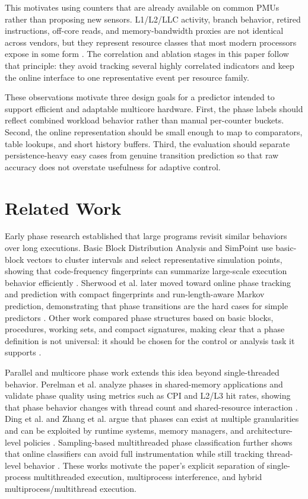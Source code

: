 \documentclass[10pt,twocolumn]{article}
\begin{document}
This motivates using counters that are already available on common PMUs rather than proposing new sensors.
L1/L2/LLC activity, branch behavior, retired instructions, off-core reads, and memory-bandwidth proxies are not identical across vendors, but they represent resource classes that most modern processors expose in some form \cite{intel2024optimization,intel2024sdm,linux2024perf,perfwiki2024}.
The correlation and ablation stages in this paper follow that principle: they avoid tracking several highly correlated indicators and keep the online interface to one representative event per resource family.

These observations motivate three design goals for a predictor intended to support efficient and adaptable multicore hardware.
First, the phase labels should reflect combined workload behavior rather than manual per-counter buckets.
Second, the online representation should be small enough to map to comparators, table lookups, and short history buffers.
Third, the evaluation should separate persistence-heavy easy cases from genuine transition prediction so that raw accuracy does not overstate usefulness for adaptive control.

\section{Related Work}

Early phase research established that large programs revisit similar behaviors over long executions.
Basic Block Distribution Analysis and SimPoint use basic-block vectors to cluster intervals and select representative simulation points, showing that code-frequency fingerprints can summarize large-scale execution behavior efficiently \cite{sherwood2001bbda,sherwood2002simpoint,hamerly2005simpoint3}.
Sherwood et al. later moved toward online phase tracking and prediction with compact fingerprints and run-length-aware Markov prediction, demonstrating that phase transitions are the hard cases for simple predictors \cite{sherwood2003phase}.
Other work compared phase structures based on basic blocks, procedures, working sets, and compact signatures, making clear that a phase definition is not universal: it should be chosen for the control or analysis task it supports \cite{dhodapkar2002managing,dhodapkar2003comparing,lau2005motivation}.

Parallel and multicore phase work extends this idea beyond single-threaded behavior.
Perelman et al. analyze phases in shared-memory applications and validate phase quality using metrics such as CPI and L2/L3 hit rates, showing that phase behavior changes with thread count and shared-resource interaction \cite{perelman2006parallel}.
Ding et al. and Zhang et al. argue that phases can exist at multiple granularities and can be exploited by runtime systems, memory managers, and architecture-level policies \cite{ding2006programphase,zhang2014multilevel}.
Sampling-based multithreaded phase classification further shows that online classifiers can avoid full instrumentation while still tracking thread-level behavior \cite{chang2013sampling}.
These works motivate the paper's explicit separation of single-process multithreaded execution, multiprocess interference, and hybrid multiprocess/multithread execution.
\end{document}
